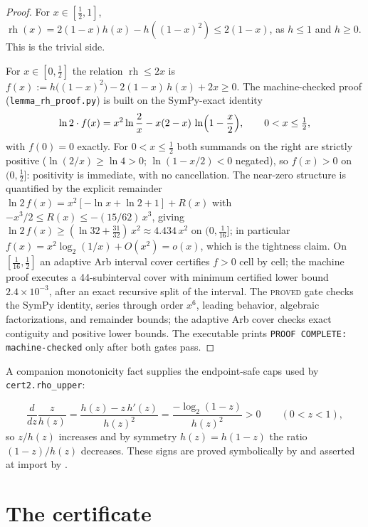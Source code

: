 \documentclass[11pt]{article}
\theoremstyle{plain}
\theoremstyle{definition}
\theoremstyle{remark}
\newcommand{\rh}{\operatorname{rh}}
\newcommand{\PROVED}{\textsc{proved}}
\begin{document}
\begin{proof}
For $x\in[\tfrac12,1]$, $\rh(x)=2(1-x)h(x)-h((1-x)^2)\le 2(1-x)$, as
$h\le1$ and $h\ge0$. This is the trivial side.

For $x\in[0,\tfrac12]$ the relation $\rh\le2x$ is
$f(x):=h\bigl((1-x)^2\bigr)-2(1-x)\,h(x)+2x\ge0$. The machine-checked
proof (\texttt{lemma\_rh\_proof.py}) is built on the SymPy-exact identity
\begin{equation}
\label{eq:rhexact}
\ln2\cdot f(x)=x^2\ln\frac{2}{x}-x(2-x)\,\ln\Bigl(1-\frac{x}{2}\Bigr),
\qquad 0<x\le\tfrac12,
\end{equation}
with $f(0)=0$ exactly. For $0<x\le\tfrac12$ both summands on the right are
strictly positive ($\ln(2/x)\ge\ln4>0$; $\ln(1-x/2)<0$ negated), so
$f(x)>0$ on $(0,\tfrac12]$: positivity is immediate, with no cancellation. The
near-zero structure is quantified by the explicit remainder
$\ln2\,f(x)=x^2[-\ln x+\ln2+1]+R(x)$ with $-x^3/2\le R(x)\le
-(15/62)\,x^3$, giving $\ln2\,f(x)\ge(\ln32+\tfrac{31}{32})\,x^2\approx
4.434\,x^2$ on $(0,\tfrac1{16}]$; in particular
$f(x)=x^2\log_2(1/x)+O(x^2)=o(x)$, which is the tightness claim. On
$[\tfrac1{16},\tfrac12]$ an adaptive Arb interval cover certifies $f>0$ cell by
cell; the machine proof executes a 44-subinterval cover with minimum certified lower
bound $2.4\times10^{-3}$, after an exact recursive split of the interval.
The \PROVED{} gate checks the SymPy identity, series through order $x^6$,
leading behavior, algebraic factorizations, and remainder bounds; the adaptive
Arb cover checks exact contiguity and positive lower bounds.  The executable
prints \texttt{PROOF COMPLETE: machine-checked} only after both gates pass.
\end{proof}

A companion monotonicity fact supplies the endpoint-safe caps used by
\texttt{cert2.rho\_upper}:

\begin{equation}
\frac{d}{dz}\frac{z}{h(z)}=\frac{h(z)-z\,h'(z)}{h(z)^2}
=\frac{-\log_2(1-z)}{h(z)^2}>0\qquad(0<z<1),
\label{eq:zoverh}
\end{equation}
so $z/h(z)$ increases and by symmetry $h(z)=h(1-z)$ the ratio
$(1-z)/h(z)$ decreases.  These signs are proved symbolically by
 and asserted at import by
.

\section{The certificate}
\label{sec:certificate}
\end{document}
